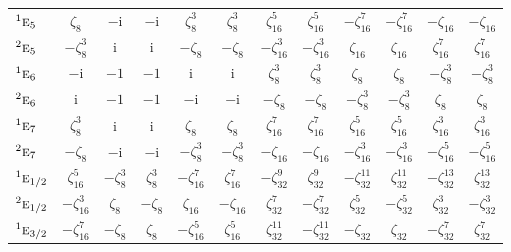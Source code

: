 \documentclass[10pt,a4paper]{article}
\makeatletter
\def\grouprule#1#2{\noalign{\marks\LTgroupmarks{\the\belowrulesep}\nobreak\vskip#1%
  \vskip\aboverulesep}\multispan\LT@cols\unskip{\leaders\hrule\@height#2\hfill\kern\z@}\cr
  \noalign{\penalty\LTrulebreak\vskip\belowrulesep\global\@lastruleclass\z@}}
\numberwithin{equation}{section}
\newcommand{\irr}[1]{\text{\normalfont\scshape #1}}
\newcommand{\conjpair}[1]{{}^{#1}}
\newcommand{\iunit}{\mathrm{i}}
\newcommand{\rootunity}[1]{\zeta_{#1}}
\makeatother
\begin{document}
{\begin{longtable}{@{}lccccccccccc@{}}
$\conjpair{1}\irr{e}_{5}$ & $\rootunity{8}$ & $-\iunit{}$ & $-\iunit{}$ & $\rootunity{8}^{3}$ & $\rootunity{8}^{3}$ & $\rootunity{16}^{5}$ & $\rootunity{16}^{5}$ & $-\rootunity{16}^{7}$ & $-\rootunity{16}^{7}$ & $-\rootunity{16}$ & $-\rootunity{16}$\\
$\conjpair{2}\irr{e}_{5}$ & $-\rootunity{8}^{3}$ & $\iunit{}$ & $\iunit{}$ & $-\rootunity{8}$ & $-\rootunity{8}$ & $-\rootunity{16}^{3}$ & $-\rootunity{16}^{3}$ & $\rootunity{16}$ & $\rootunity{16}$ & $\rootunity{16}^{7}$ & $\rootunity{16}^{7}$\\
$\conjpair{1}\irr{e}_{6}$ & $-\iunit{}$ & $-1$ & $-1$ & $\iunit{}$ & $\iunit{}$ & $\rootunity{8}^{3}$ & $\rootunity{8}^{3}$ & $\rootunity{8}$ & $\rootunity{8}$ & $-\rootunity{8}^{3}$ & $-\rootunity{8}^{3}$\\
$\conjpair{2}\irr{e}_{6}$ & $\iunit{}$ & $-1$ & $-1$ & $-\iunit{}$ & $-\iunit{}$ & $-\rootunity{8}$ & $-\rootunity{8}$ & $-\rootunity{8}^{3}$ & $-\rootunity{8}^{3}$ & $\rootunity{8}$ & $\rootunity{8}$\\
$\conjpair{1}\irr{e}_{7}$ & $\rootunity{8}^{3}$ & $\iunit{}$ & $\iunit{}$ & $\rootunity{8}$ & $\rootunity{8}$ & $\rootunity{16}^{7}$ & $\rootunity{16}^{7}$ & $\rootunity{16}^{5}$ & $\rootunity{16}^{5}$ & $\rootunity{16}^{3}$ & $\rootunity{16}^{3}$\\
$\conjpair{2}\irr{e}_{7}$ & $-\rootunity{8}$ & $-\iunit{}$ & $-\iunit{}$ & $-\rootunity{8}^{3}$ & $-\rootunity{8}^{3}$ & $-\rootunity{16}$ & $-\rootunity{16}$ & $-\rootunity{16}^{3}$ & $-\rootunity{16}^{3}$ & $-\rootunity{16}^{5}$ & $-\rootunity{16}^{5}$\\
\grouprule{0pt}{\lightrulewidth}
$\conjpair{1}\irr{e}_{1/2}$ & $\rootunity{16}^{5}$ & $-\rootunity{8}^{3}$ & $\rootunity{8}^{3}$ & $-\rootunity{16}^{7}$ & $\rootunity{16}^{7}$ & $-\rootunity{32}^{9}$ & $\rootunity{32}^{9}$ & $-\rootunity{32}^{11}$ & $\rootunity{32}^{11}$ & $-\rootunity{32}^{13}$ & $\rootunity{32}^{13}$\\
$\conjpair{2}\irr{e}_{1/2}$ & $-\rootunity{16}^{3}$ & $\rootunity{8}$ & $-\rootunity{8}$ & $\rootunity{16}$ & $-\rootunity{16}$ & $\rootunity{32}^{7}$ & $-\rootunity{32}^{7}$ & $\rootunity{32}^{5}$ & $-\rootunity{32}^{5}$ & $\rootunity{32}^{3}$ & $-\rootunity{32}^{3}$\\
$\conjpair{1}\irr{e}_{3/2}$ & $-\rootunity{16}^{7}$ & $-\rootunity{8}$ & $\rootunity{8}$ & $-\rootunity{16}^{5}$ & $\rootunity{16}^{5}$ & $\rootunity{32}^{11}$ & $-\rootunity{32}^{11}$ & $-\rootunity{32}$ & $\rootunity{32}$ & $-\rootunity{32}^{7}$ & $\rootunity{32}^{7}$\\

\end{longtable}}
\end{document}

